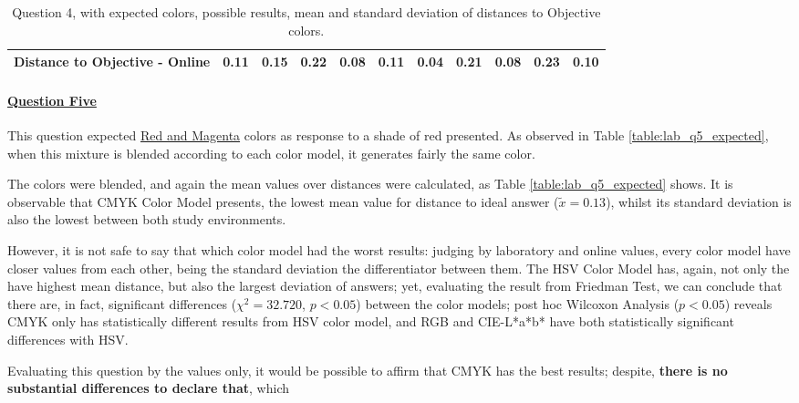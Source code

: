 \begin{table}[H]
{\begin{tabular}{lccccccccccccc}
    \multicolumn{4}{l}{Distance to Objective - Online}                                                                                               & \multicolumn{1}{|c}{0.11}       & \multicolumn{1}{c|}{0.15}    & \multicolumn{1}{|c}{0.22}       & \multicolumn{1}{c|}{0.08}    & \multicolumn{1}{|c}{\textbf{0.11}}         & \multicolumn{1}{c|}{0.04}    & \multicolumn{1}{|c}{0.21}        & \multicolumn{1}{c|}{0.08}    & \multicolumn{1}{|c}{0.23}       & \multicolumn{1}{c|}{0.10}    \\ \hline
    \end{tabular}}
  \caption[Question 4, with expected Results.]{Question 4, with expected colors, possible results, mean and standard deviation of distances to Objective colors.}
  \label{table:lab_q4_expected}
\end{table}
%
\paragraph{\ul{Question Five}}
%
This question expected \ul{Red and Magenta} colors as response to a shade of red presented. As observed in Table \ref{table:lab_q5_expected}, when this mixture is blended according
to each color model, it generates fairly the same color. \par
%
The colors were blended, and again the mean values over distances were calculated, as Table \ref{table:lab_q5_expected} shows. It is observable that CMYK Color Model presents,
the lowest mean value for distance to ideal answer ($\tilde{x} = 0.13$), whilst its standard deviation is also the lowest between both study environments. \par
%
However, it is not safe to say that which color model had the worst results: judging by laboratory and online values, every color model have closer values from each other, being the
standard deviation the differentiator between them. The HSV Color Model has, again, not only the have highest mean distance, but also the largest deviation of answers; yet, evaluating
the result from Friedman Test, we can conclude that there are, in fact, significant differences ($\chi^2 = 32.720$, $p < 0.05$) between the color models; post hoc Wilcoxon Analysis
($p < 0.05$) reveals CMYK only has statistically different results from HSV color model, and RGB and CIE-L*a*b* have both statistically significant differences with HSV. \par
%
Evaluating this question by the values only, it would be possible to affirm that CMYK has the best results; despite, \textbf{there is no substantial differences to declare that}, which
